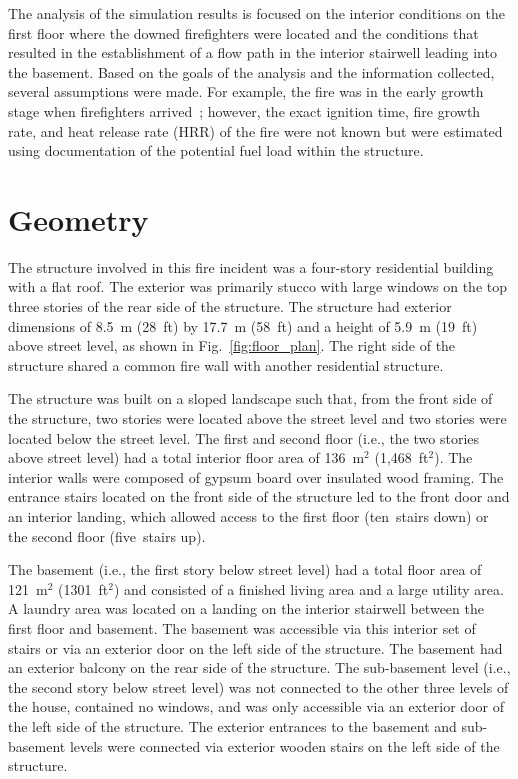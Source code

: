 \documentclass[12pt,oneside]{book}
\begin{document}
\clearpage


The analysis of the simulation results is focused on the interior conditions on the first floor where the downed firefighters were located and the conditions that resulted in the establishment of a flow path in the interior stairwell leading into the basement. Based on the goals of the analysis and the information collected, several assumptions were made. For example, the fire was in the early growth stage when firefighters arrived~\cite{NIOSH:Bowyer2}; however, the exact ignition time, fire growth rate, and heat release rate (HRR) of the fire were not known but were estimated using documentation of the potential fuel load within the structure.

\section{Geometry}
\label{sec:geometry}

The structure involved in this fire incident was a four-story residential building with a flat roof. The exterior was primarily stucco with large windows on the top three stories of the rear side of the structure. The structure had exterior dimensions of 8.5~m (28~ft) by 17.7~m (58~ft) and a height of 5.9~m (19~ft) above street level, as shown in Fig.~\ref{fig:floor_plan}. The right side of the structure shared a common fire wall with another residential structure.

The structure was built on a sloped landscape such that, from the front side of the structure, two stories were located above the street level and two stories were located below the street level. The first and second floor (i.e., the two stories above street level) had a total interior floor area of 136~m$^2$ (1,468~ft$^2$). The interior walls were composed of gypsum board over insulated wood framing. The entrance stairs located on the front side of the structure led to the front door and an interior landing, which allowed access to the first floor (ten~stairs down) or the second floor (five~stairs up).

The basement (i.e., the first story below street level) had a total floor area of 121~m$^2$ (1301~ft$^2$) and consisted of a finished living area and a large utility area. A laundry area was located on a landing on the interior stairwell between the first floor and basement. The basement was accessible via this interior set of stairs or via an exterior door on the left side of the structure. The basement had an exterior balcony on the rear side of the structure. The sub-basement level (i.e., the second story below street level) was not connected to the other three levels of the house, contained no windows, and was only accessible via an exterior door of the left side of the structure. The exterior entrances to the basement and sub-basement levels were connected via exterior wooden stairs on the left side of the structure.
\end{document}
